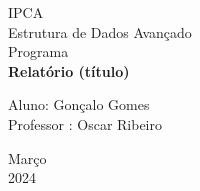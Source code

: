 \documentclass[a4paper, 12pt]{article}
\begin{document}

\begin{titlepage}
	\begin{center}
	

		\Huge{IPCA }\\
		\large{Estrutura de Dados Avançado}\\ 
		\large{Programa}\\ 
		\vspace{15pt}
        \vspace{95pt}
        \textbf{\LARGE{Relatório (título) }}\\
		\vspace{3,5cm}
	\end{center}
	
	\begin{flushleft}
		\begin{tabbing}
			Aluno: Gonçalo Gomes \\
			Professor : Oscar Ribeiro \\
	\end{tabbing}
 \end{flushleft}
	\vspace{1cm}
	
	\begin{center}
		\vspace{\fill}
			 Março\\
		 2024
			\end{center}
\end{titlepage}

\end{document}
